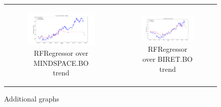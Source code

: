 \documentclass[11pt]{article}
\begin{document}
\begin{figure}[h!]
\begin{tabular}{cc}
        \begin{subfigure}[b]{0.48\textwidth}
            \centering
            \includegraphics[width=\linewidth]{figures/rf_tuned/MINDSPACE_predict.png}
            \caption{RFRegressor over MINDSPACE.BO trend}
            \label{fig:1a}
        \end{subfigure} &
        \begin{subfigure}[b]{0.48\textwidth}
            \centering
            \includegraphics[width=\linewidth]{figures/rf_tuned/BIRET_predict.png}
            \caption{RFRegressor over BIRET.BO trend}
            \label{fig:1b}
        \end{subfigure} \\
    \end{tabular}
    \caption{Additional graphs}
    \label{fig:4x2grid}
\end{figure}
\end{document}
